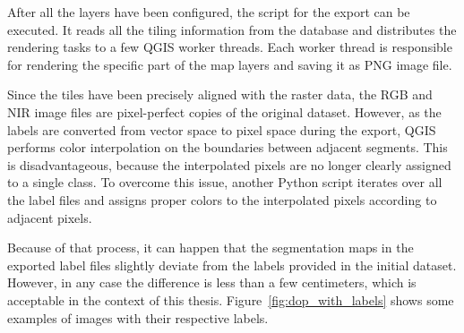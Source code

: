 After all the layers have been configured, the script for the export can be executed. It reads all the tiling information from the database and distributes the rendering tasks to a few QGIS worker threads. Each worker thread is responsible for rendering the specific part of the map layers and saving it as PNG image file.

Since the tiles have been precisely aligned with the raster data, the RGB and NIR image files are pixel-perfect copies of the original dataset. However, as the labels are converted from vector space to pixel space during the export, QGIS performs color interpolation on the boundaries between adjacent segments. This is disadvantageous, because the interpolated pixels are no longer clearly assigned to a single class. To overcome this issue, another Python script iterates over all the label files and assigns proper colors to the interpolated pixels according to adjacent pixels.

Because of that process, it can happen that the segmentation maps in the exported label files slightly deviate from the labels provided in the initial dataset. However, in any case the difference is less than a few centimeters, which is acceptable in the context of this thesis. Figure~\ref{fig:dop_with_labels} shows some examples of images with their respective labels.

